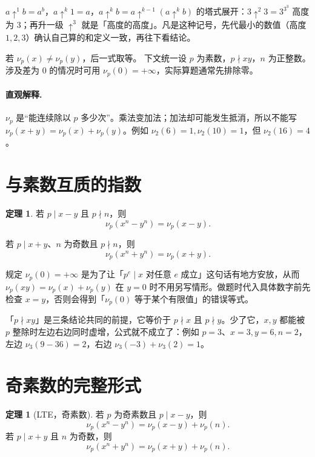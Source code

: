 \documentclass[UTF8,a4paper,11pt,twoside,openright,fontset=fandol]{ctexbook}
\theoremstyle{definition}
\newtheorem{theorem}[definition]{定理}
\begin{document}
\begin{tip}[箭号记号的两条约定]
$a\uparrow^1 b=a^b$，$a\uparrow^{k}1=a$，$a\uparrow^{k}b=a\uparrow^{k-1}(a\uparrow^{k}b)$ 的塔式展开：$3\uparrow^2 3=3^{3^3}$ 高度为 $3$；再升一级 $\uparrow^3$ 就是「高度的高度」。凡是这种记号，先代最小的数值（高度 $1,2,3$）确认自己算的和定义一致，再往下看结论。
\end{tip}

若 $\nu_p(x)\ne\nu_p(y)$，后一式取等。
下文统一设 $p$ 为素数，$p\nmid xy$，$n$ 为正整数。涉及差为 $0$ 的情况时可用 $\nu_p(0)=+\infty$，实际算题通常先排除零。


\paragraph{直观解释.} $\nu_p$ 是“能连续除以 $p$ 多少次”。乘法变加法；加法却可能发生抵消，所以不能写 $\nu_p(x+y)=\nu_p(x)+\nu_p(y)$。例如 $\nu_2(6)=1,\nu_2(10)=1$，但 $\nu_2(16)=4$。
\section{与素数互质的指数}
\begin{theorem}
若 $p\mid x-y$ 且 $p\nmid n$，则
\[
 \nu_p(x^n-y^n)=\nu_p(x-y).
\]



若 $p\mid x+y$、$n$ 为奇数且 $p\nmid n$，则
\[
 \nu_p(x^n+y^n)=\nu_p(x+y).
\]
\end{theorem}

\begin{tip}[口径：为什么规定 $\nu_p(0)=+\infty$]
规定 $\nu_p(0)=+\infty$ 是为了让「$p^e\mid x$ 对任意 $e$ 成立」这句话有地方安放，从而 $\nu_p(xy)=\nu_p(x)+\nu_p(y)$ 在 $y=0$ 时不用另写情形。做题时代入具体数字前先检查 $x=y$，否则会得到「$\nu_p(0)$ 等于某个有限值」的错误等式。
\end{tip}


\begin{tip}
「$p\nmid xy$」是三条结论共同的前提，它等价于 $p\nmid x$ 且 $p\nmid y$。少了它，$x,y$ 都能被 $p$ 整除时左边右边同时虚增，公式就不成立了：例如 $p=3$、$x=3,y=6,n=2$，左边 $\nu_3(9-36)=2$，右边 $\nu_3(-3)+\nu_3(2)=1$。
\end{tip}

\section{奇素数的完整形式}
\begin{theorem}[LTE，奇素数]
若 $p$ 为奇素数且 $p\mid x-y$，则
\[
 \nu_p(x^n-y^n)=\nu_p(x-y)+\nu_p(n).
\]
若 $p\mid x+y$ 且 $n$ 为奇数，则
\[
 \nu_p(x^n+y^n)=\nu_p(x+y)+\nu_p(n).
\]
\end{theorem}
\end{document}
